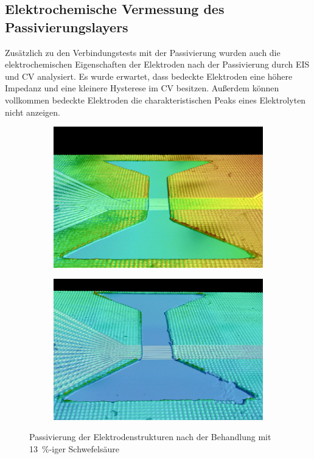 \subsection{Elektrochemische Vermessung des Passivierungslayers}
Zusätzlich zu den Verbindungstests mit der Passivierung wurden auch die elektrochemischen Eigenschaften der Elektroden nach der Passivierung durch EIS und CV analysiert. Es wurde erwartet, dass bedeckte Elektroden eine höhere Impedanz und eine kleinere Hysterese im CV besitzen. Außerdem können vollkommen bedeckte Elektroden die charakteristischen Peaks eines Elektrolyten nicht anzeigen.

\begin{figure}[!htb]
\begin{subfigure}[l]{0.49\linewidth}
\centering
\includegraphics[trim=0 0mm 0 115,clip,width=\linewidth]{img/180mu.png}
\end{subfigure}%
\hspace{6mm}
\begin{subfigure}[r]{0.49\linewidth}
\centering
\includegraphics[trim=0 20mm 0 50,clip,width=\linewidth]{img/240um.png}
\end{subfigure}
\caption{Passivierung der Elektrodenstrukturen nach der Behandlung mit \SI{13}{\percent}-iger Schwefelsäure}
\label{fig:passivierung}
\end{figure}

